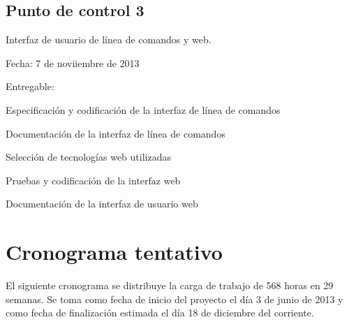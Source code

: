 \documentclass[bibliography=openstyle,DIV=12]{scrartcl}
\begin{document}
\subsection{Punto de control 3}
Interfaz de usuario de línea de comandos y web.
\begin{description*}
  \item[Fecha:] 7 de noviiembre de 2013
  \item[Entregable:]
  \item
    \begin{minipage}{.8\textwidth}
      \begin{itemize*}
      \item Especificación y codificación de la interfaz de línea de comandos
      \item Documentación de la interfaz de línea de comandos
      \item Selección de tecnologías web utilizadas
      \item Pruebas y codificación de la interfaz web
      \item Documentación de la interfaz de usuario web
      \end{itemize*}
    \end{minipage}
\end{description*}
%
\section{Cronograma tentativo}
El siguiente cronograma se distribuye la carga de trabajo de 568 horas
en 29 semanas. Se toma como fecha de inicio del proyecto el día 3 de junio de 2013
y como fecha de finalización estimada el día 18 de diciembre del corriente.
\end{document}
